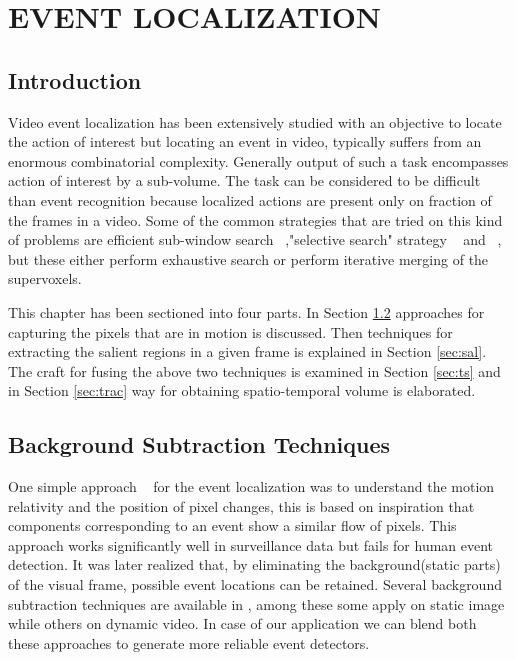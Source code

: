 \chapter{EVENT LOCALIZATION}
 \label{chap:eventLo}
\section{Introduction}
Video event localization  has been extensively studied with an objective to locate the action of interest but locating an event in video, typically suffers from an enormous combinatorial complexity. Generally output of such a task encompasses action of interest by a sub-volume. The task can be considered to be difficult than event recognition because localized actions are present only on fraction of the frames in a video. Some of the common strategies that are tried on this kind of problems are efficient sub-window search ~\citep{subwindowsearch},"selective search" strategy ~\citep{selectivesearch}  and ~\cite{tubelet}, but these either perform exhaustive search or perform iterative merging of the supervoxels. 

\par This chapter has been sectioned into four parts. In Section \ref{sec:bst} approaches for capturing the pixels that are in motion is discussed.  Then techniques for extracting the salient regions in a given frame is explained in Section \ref{sec:sal}. The craft for fusing the above two techniques is examined in Section \ref{sec:ts} and in Section \ref{sec:trac} way for obtaining spatio-temporal volume is elaborated.

\section{Background Subtraction Techniques} 
 \label{sec:bst}
\par One simple approach ~\citep{Basharat08} for the event localization was to understand the motion relativity and the position of pixel changes, this is based on inspiration that components corresponding to an event show a similar flow of pixels. This approach works significantly well in surveillance data but fails for human event detection. It was later realized that, by eliminating the background(static parts) of the visual frame,  possible event locations can be retained.  Several background subtraction techniques are available in \cite{Piccardi04}, among these some apply on static image while others on dynamic video. In case of our application we can blend both these approaches to generate more reliable event detectors.

